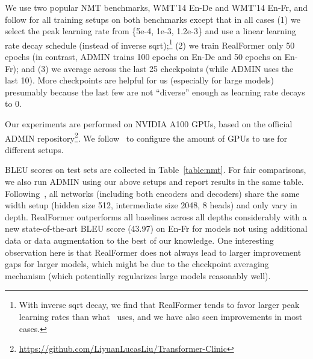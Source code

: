 \documentclass[11pt,a4paper]{article}
\begin{document}
We use two popular NMT benchmarks, WMT'14 En-De and WMT'14 En-Fr, and follow \citet{Liu-2020-admin} for all training setups on both benchmarks except that in all cases (1) we select the peak learning rate from \{5e-4, 1e-3, 1.2e-3\} and use a linear learning rate decay schedule (instead of inverse sqrt);\footnote{With inverse sqrt decay, we find that RealFormer tends to favor larger peak learning rates than what~\citet{Liu-2020-admin} uses, and we have also seen improvements in most cases.} (2) we train RealFormer only 50 epochs (in contrast, ADMIN trains 100 epochs on En-De and 50 epochs on En-Fr); and (3) we average across the last 25 checkpoints (while ADMIN uses the last 10). 
More checkpoints are helpful for us (especially for large models) presumably because the last few are not ``diverse'' enough as learning rate decays to 0.

Our experiments are performed on NVIDIA A100 GPUs, based on the official ADMIN repository\footnote{\url{https://github.com/LiyuanLucasLiu/Transformer-Clinic}}.
We follow~\citet{Liu-2020-admin} to configure the amount of GPUs to use for different setups.

BLEU scores on test sets are collected in Table~\ref{table:nmt}. For fair comparisons, we also run ADMIN using our above setups and report results in the same table. Following~\citet{Liu-2020-admin}, all networks (including both encoders and decoders) share the same width setup (hidden size 512, intermediate size 2048, 8 heads) and only vary in depth. RealFormer outperforms all baselines across all depths considerably with a new state-of-the-art BLEU score (43.97) on En-Fr for models not using additional data or data augmentation to the best of our knowledge.
One interesting observation here is that RealFormer does not always lead to larger improvement gaps for larger models, which might be due to the checkpoint averaging mechanism (which potentially regularizes large models reasonably well).
\end{document}
